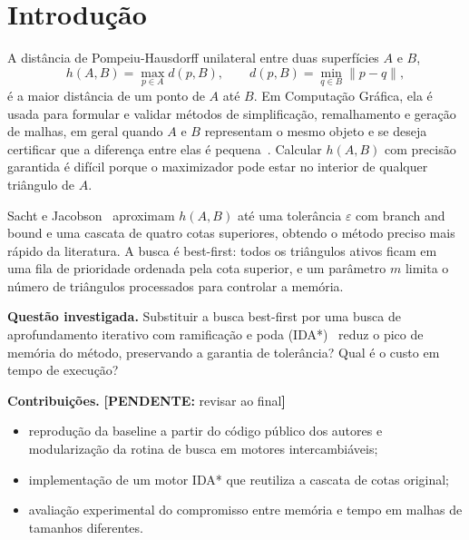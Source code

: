 \documentclass[9pt,a4paper,twocolumn]{extarticle}
\newif\ifmostrarorientacoes
\newcommand{\orientacao}[1]{%
  \ifmostrarorientacoes
    \par\smallskip
    \noindent\fcolorbox{black!35}{black!4}{%
      \parbox{0.94\columnwidth}{\fontsize{7.4}{8.2}\selectfont\textbf{Orientação aos autores:} #1}%
    }%
    \par\smallskip
  \fi
}
\newcommand{\pendente}[1]{{\color{red!70!black}\textbf{[PENDENTE:} #1\textbf{]}}}
\begin{document}
\section{Introdução}
\orientacao{Contextualize o problema de Computação Gráfica, explique sua relevância,
apresente o trabalho de referência e conduza o leitor até a questão específica investigada.
A introdução deve terminar com a questão/hipótese e as contribuições do artigo.}

A distância de Pompeiu-Hausdorff unilateral entre duas superfícies $A$ e $B$,
\begin{equation}
  h(A,B) = \max_{p \in A} d(p, B), \qquad d(p,B) = \min_{q \in B} \lVert p - q \rVert,
  \label{eq:hausdorff}
\end{equation}
é a maior distância de um ponto de $A$ até $B$. Em Computação Gráfica, ela é usada
para formular e validar métodos de simplificação, remalhamento e geração de malhas,
em geral quando $A$ e $B$ representam o mesmo objeto e se deseja certificar que a
diferença entre elas é pequena~\parencite{sacht2024cascading}. Calcular $h(A,B)$
com precisão garantida é difícil porque o maximizador pode estar no interior de
qualquer triângulo de $A$.

Sacht e Jacobson~\parencite{sacht2024cascading} aproximam $h(A,B)$ até uma tolerância
$\varepsilon$ com branch and bound e uma cascata de quatro cotas superiores, obtendo
o método preciso mais rápido da literatura. A busca é best-first: todos os triângulos
ativos ficam em uma fila de prioridade ordenada pela cota superior, e um parâmetro
$m$ limita o número de triângulos processados para controlar a memória.

\textbf{Questão investigada.} Substituir a busca best-first por uma busca de
aprofundamento iterativo com ramificação e poda (IDA*)~\parencite{korf1985depth}
reduz o pico de memória do método, preservando a garantia de tolerância? Qual é o
custo em tempo de execução?

\textbf{Contribuições.} \pendente{revisar ao final}
\begin{itemize}
  \item reprodução da baseline a partir do código público dos autores e
        modularização da rotina de busca em motores intercambiáveis;
  \item implementação de um motor IDA* que reutiliza a cascata de cotas original;
  \item avaliação experimental do compromisso entre memória e tempo em malhas de
        tamanhos diferentes.
\end{itemize}
\end{document}
